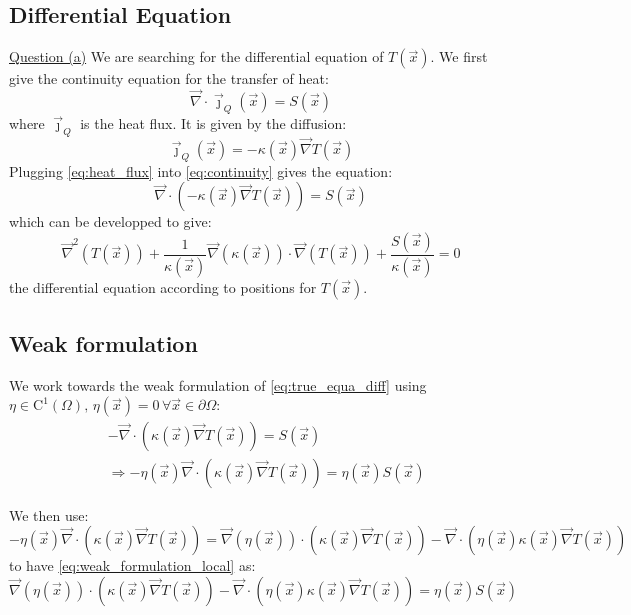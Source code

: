 \subsection{Differential Equation}
\underline{Question (a)}
We are searching for the differential equation of $T(\vec{x})$. We first give the continuity equation for the transfer of heat:
\begin{equation}
    \vec{\nabla} \cdot \vec{\jmath}_Q(\vec{x}) = S(\vec{x})
    \label{eq:continuity}
\end{equation}
where $\vec{\jmath}_Q$ is the heat flux. It is given by the diffusion:
\begin{equation}
    \vec{\jmath}_Q(\vec{x}) = -\kappa (\vec{x}) \vec{\nabla}T(\vec{x})
    \label{eq:heat_flux}
\end{equation}
Plugging \autoref{eq:heat_flux} into \autoref{eq:continuity} gives the equation:
\begin{equation}
    \vec{\nabla} \cdot (-\kappa(\vec{x})\vec{\nabla}T(\vec{x})) = S(\vec{x})
    \label{eq:true_equa_diff}
\end{equation}
which can be developped to give:
\begin{equation}
    \vec{\nabla}^2(T(\vec{x})) + \frac{1}{\kappa(\vec{x})} \vec{\nabla}(\kappa(\vec{x})) \cdot \vec{\nabla}(T(\vec{x})) + \frac{S(\vec{x})}{\kappa(\vec{x})} = 0
    \label{eq:equa_diff_T}
\end{equation}
the differential equation according to positions for $T(\vec{x})$.

\subsection{Weak formulation}
We work towards the weak formulation of \autoref{eq:true_equa_diff} using $\eta \in \mathrm{C}^1(\Omega), \, \eta(\vec{x}) = 0 \,\forall \vec{x} \in \partial\Omega$:
\begin{equation}
    \begin{aligned}
        & -\vec{\nabla} \cdot (\kappa(\vec{x})\vec{\nabla}T(\vec{x})) = S(\vec{x}) \\
        & \Rightarrow -\eta(\vec{x}) \vec{\nabla} \cdot (\kappa(\vec{x})\vec{\nabla}T(\vec{x})) = \eta(\vec{x}) S(\vec{x})
    \end{aligned}
    \label{eq:weak_formulation_local}
\end{equation}

We then use:
\begin{equation}
    -\eta(\vec{x})\vec{\nabla}\cdot(\kappa(\vec{x})\vec{\nabla}T(\vec{x})) = \vec{\nabla}(\eta(\vec{x}))\cdot(\kappa(\vec{x})\vec{\nabla}T(\vec{x})) - \vec{\nabla}\cdot(\eta(\vec{x})\kappa(\vec{x})\vec{\nabla}T(\vec{x}))
\end{equation}
to have \autoref{eq:weak_formulation_local} as:
\begin{equation}
    \vec{\nabla}(\eta(\vec{x}))\cdot(\kappa(\vec{x})\vec{\nabla}T(\vec{x})) - \vec{\nabla}\cdot(\eta(\vec{x})\kappa(\vec{x})\vec{\nabla}T(\vec{x})) = \eta(\vec{x})S(\vec{x})
\end{equation}

